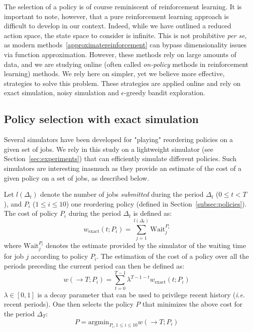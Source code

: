 \documentclass[sigconf,review]{acmart}
\begin{document}
The selection of a policy is of course reminiscent of reinforcement learning.
It is important to note, however, that a pure reinforcement learning approach
is difficult to develop in our context. Indeed, while we have outlined a
reduced action space, the state space to consider is infinite. This is not
prohibitive \textit{per se}, as modern methods~\ref{approximatereinforcement}
can bypass dimensionality issues via function approximation. However, these
methods rely on large amounts of data, and we are studying online (often called
\textit{on-policy} methods in reinforcement learning) methods. We rely here on
simpler, yet we believe more effective, strategies to solve this problem.
These strategies are applied online and rely on exact simulation, noisy
simulation and $\epsilon$-greedy bandit exploration.

\subsection{Policy selection with exact simulation}
\label{sub:feedback}

Several simulators have been developed for "playing" reordering policies on a
given set of jobs. We rely in this study on a lightweight simulator (see
Section~\ref{sec:experiments}) that can efficiently simulate different
policies. Such simulators are interesting inasmuch as they provide an estimate
of the cost of a given policy on a set of jobs, as described below.

Let $l(\Delta_t)$ denote the number of jobs \textit{submitted} during the
period $\Delta_t$ ($0 \le t < T$), and $P_i$ ($1 \le i \le 10$) one reordering
policy (defined in Section~\ref{subsec:policies}). The cost of policy $P_i$
during the period $\Delta_t$ is defined as:
%
\begin{equation} \label{eq:cost-exact} w_{\mbox{exact}}(t;P_i) =
\sum_{j=1}^{l(\Delta_t)} \mbox{Wait}_j^{P_i} \end{equation}
%
where $\mbox{Wait}_j^{P_i}$ denotes the estimate provided by the simulator of
the waiting time for job $j$ according to policy $P_i$. The estimation of the
cost of a policy over all the periods preceding the current period can then be
defined as:
%
\begin{equation} \label{eq:tot-cost-exact} w(\rightarrow T;P_i) =
\sum_{t=0}^{T-1} \lambda^{T-1-t} w_{\mbox{exact}}(t;P_i) \end{equation}
%
$\lambda \in [0,1]$ is a decay parameter that can be used to privilege recent
history (\textit{i.e.} recent periods). One then selects the policy $P$ that
minimizes the above cost for the period $\Delta_T$:
%
\begin{equation} \label{eq:select-exact} P = \mbox{argmin}_{P_i, 1 \le i \le
10} w(\rightarrow T;P_i) \end{equation}
\end{document}
